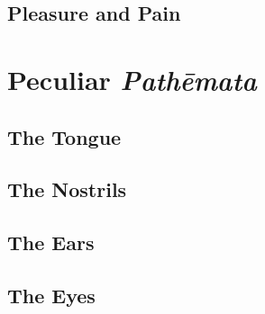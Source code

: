 
\subsection{Pleasure and Pain} %
\label{sub:pleasure_and_pain}






\section{Peculiar \emph{Pathēmata}} %
\label{sec:peculiar_emph_pathemata}

\subsection{The Tongue} %
\label{sub:the_tongue}




\subsection{The Nostrils} %
\label{sub:the_nostrils}




\subsection{The Ears} %
\label{sub:the_ears}




\subsection{The Eyes} %
\label{sub:the_eyes}





